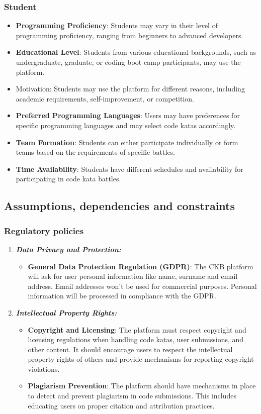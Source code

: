 \subsubsection{Student}
\begin{itemize}
    \item \textbf{Programming Proficiency}: Students may vary in their level of programming proficiency, ranging from beginners to advanced developers.
    \item \textbf{Educational Level}: Students from various educational backgrounds, such as undergraduate, graduate, or coding boot camp participants, may use the platform.
    \item Motivation: Students may use the platform for different reasons, including academic requirements, self-improvement, or competition.
    \item \textbf{Preferred Programming Languages}: Users may have preferences for specific programming languages and may select code katas accordingly.
    \item \textbf{Team Formation}: Students can either participate individually or form teams based on the requirements of specific battles.
    \item \textbf{Time Availability}: Students have different schedules and availability for participating in code kata battles.
\end{itemize}
\subsection{Assumptions, dependencies and constraints}
\subsubsection{Regulatory policies}
\begin{enumerate}
    \item \textbf{\textit{Data Privacy and Protection:}}
    \begin{itemize}
        \item \textbf{General Data Protection Regulation (GDPR)}: The CKB platform will ask for user personal information like name, surname and email address. Email addresses won’t be used for commercial purposes. Personal information will be processed in compliance with the GDPR.
    \end{itemize}
    \item \textbf{\textit{Intellectual Property Rights:}}
    \begin{itemize}
        \item \textbf{Copyright and Licensing}: The platform must respect copyright and licensing regulations when handling code katas, user submissions, and other content. It should encourage users to respect the intellectual property rights of others and provide mechanisms for reporting copyright violations.
        \item \textbf{Plagiarism Prevention}: The platform should have mechanisms in place to detect and prevent plagiarism in code submissions. This includes educating users on proper citation and attribution practices.
    \end{itemize}
\end{enumerate}


